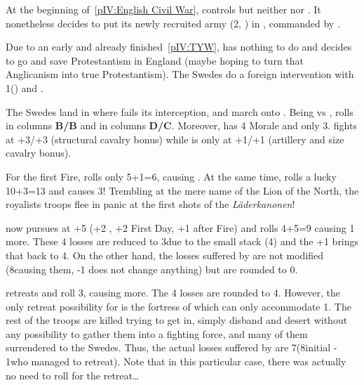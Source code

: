 \begin{exemple}
  At the beginning of~\ref{pIV:English Civil War},  controls
  \provinceCornwall but neither \provinceGloucester nor \provinceWessex. It
  nonetheless decides to put its newly recruited army (2\ARMY\faceplus,
  ) in \provinceCornwall, commanded by
  .

  Due to an early and already finished~\ref{pIV:TYW}, 
  has nothing to do and decides to go and save Protestantism in England (maybe
  hoping to turn that Anglicanism into true Protestantism). The Swedes do a
  foreign intervention with 1\ARMY\faceplus () and
  .

  The Swedes land in \provinceWessex where  fails its
  interception, and march onto \provinceCornwall. Being \TBAR vs \TMUS, \SUE
  rolls in columns \textbf{B/B} and  in columns
  \textbf{D/C}. Moreover, \SUE has 4 Morale and  only 3. \SUE
  fights at +3/+3 (structural cavalry bonus) while  is only
  at +1/+1 (artillery and size cavalry bonus).

  For the first Fire,  rolls only 5+1=6, causing \texttu. At
  the same time,  rolls a lucky 10+3=13 and causes
  3\textetoile\textetoile\textetoile! Trembling at the mere name of the Lion
  of the North, the royalists troops flee in panic at the first shots of the
  \emph{L\"{a}derkanonen}!

   now pursues at +5 (+2 \Shock, +2 First Day, +1 after
  Fire) and rolls 4+5=9 causing 1 more. These 4 losses are
  reduced to 3\texttu due to the small \SUE stack (4\LD) and the +1
   brings that back to 4. On the other hand, the
  \texttu losses suffered by \SUE are not modified (8\LD causing them, -1
   does not change anything) but are rounded to 0.

   retreats and roll 3, causing \texttu more. The 4\texttu
  losses are rounded to 4. However, the only retreat possibility for
   is the fortress of  which can only
  accommodate 1\LD. The rest of the troops are killed trying to get in, simply
  disband and desert without any possibility to gather them into a fighting
  force, and many of them surrendered to the Swedes. Thus, the actual losses
  suffered by  are 7\LD (8\LD initial - 1\LD who managed to
  retreat). Note that in this particular case, there was actually no need to
  roll for the retreat\ldots
\end{exemple}

